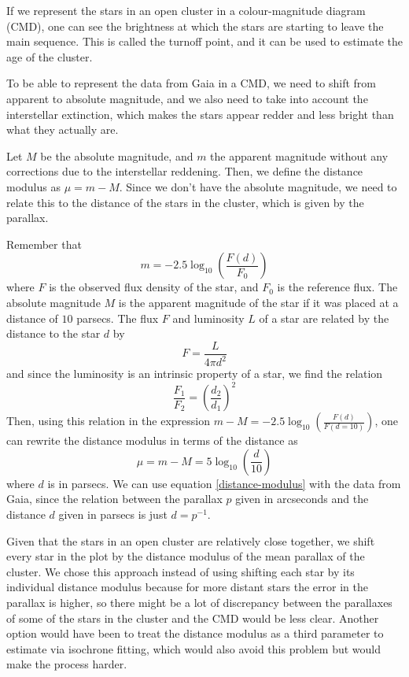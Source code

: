\documentclass[twocolumn]{revtex4}
\begin{document}
If we represent the stars in an open cluster in a colour-magnitude diagram (CMD), one can see the brightness at which the stars are starting to leave the main sequence. This is called the turnoff point, and it can be used to estimate the age of the cluster.

To be able to represent the data from Gaia in a CMD, we need to shift from apparent to absolute magnitude, and we also need to take into account the interstellar extinction, which makes the stars appear redder and less bright than what they actually are.

Let $M$ be the absolute magnitude, and $m$ the apparent magnitude without any corrections due to the interstellar reddening. Then, we define the distance modulus as $\mu = m - M$. Since we don't have the absolute magnitude, we need to relate this to the distance of the stars in the cluster, which is given by the parallax.

Remember that
\[m = -2.5 \log_{10} \left( \frac{F(d)}{F_0} \right) \]
where $F$ is the observed flux density of the star, and $F_0$ is the reference flux.
The absolute magnitude $M$ is the apparent magnitude of the star if it was placed at a distance of $10$ parsecs. The flux $F$ and luminosity $L$ of a star are related by the distance to the star $d$ by
\[F = \frac{L}{4 \pi d^2}\]
and since the luminosity is an intrinsic property of a star, we find the relation
\begin{equation}
\frac{F_1}{F_2} = \left( \frac{d_2}{d_1} \right)^2
\end{equation}
Then, using this relation in the expression $m - M = -2.5 \log_{10} \left( \frac{F(d)}{F(d=10)} \right)$, one can rewrite the distance modulus in terms of the distance as
\begin{equation}
\label{distance-modulus}
\mu = m - M = 5 \log_{10} \left( \frac{d}{10} \right)
\end{equation}
where $d$ is in parsecs. We can use equation \ref{distance-modulus} with the data from Gaia, since the relation between the parallax $p$ given in arcseconds and the distance $d$ given in parsecs is just $d = p^{-1}$.

Given that the stars in an open cluster are relatively close together, we shift every star in the plot by the distance modulus of the mean parallax of the cluster. We chose this approach instead of using shifting each star by its individual distance modulus because for more distant stars the error in the parallax is higher, so there might be a lot of discrepancy between the parallaxes of some of the stars in the cluster and the CMD would be less clear. Another option would have been to treat the distance modulus as a third parameter to estimate via isochrone fitting, which would also avoid this problem but would make the process harder.
\end{document}
